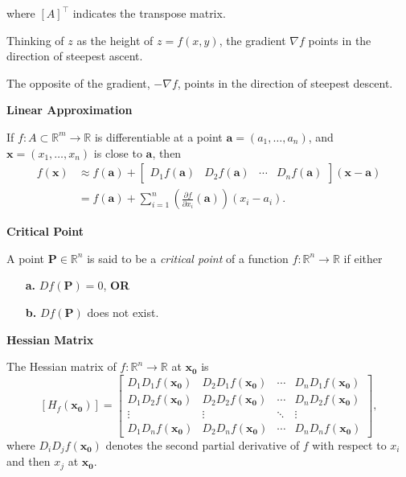 \documentclass{article}
\newcommand{\R}{\mathbb{R}}
\begin{document}
where \( [A]^{\top} \) indicates the transpose matrix.

Thinking of \( z \) as the height of \( z = f(x,y) \), the gradient \( \nabla f \) points in the direction of steepest ascent. 

The opposite of the gradient, \( -\nabla f \), points in the direction of steepest descent.

\vspace{0.5cm}

\noindent \textbf{Linear Approximation}

If \( f : A \subset \mathbb{R}^m \rightarrow \mathbb{R} \) is differentiable at a point \( \bm{a} = (a_1, \ldots, a_n) \), and \( \bm{x} = (x_1, \ldots, x_n) \) is close to \( \bm{a} \), then
\begin{align*}
f(\bm{x}) &\approx f(\bm{a}) + \begin{bmatrix} D_1f(\bm{a}) & D_2f(\bm{a}) & \cdots & D_nf(\bm{a}) \end{bmatrix} (\bm{x} - \bm{a}) \\
         &= f(\bm{a}) + \sum_{i=1}^{n} \left( \frac{\partial f}{\partial x_i}(\bm{a}) \right) (x_i - a_i).
\end{align*}



\vspace{0.5cm}

\noindent \textbf{Critical Point}

A point \( \bm{P} \in \mathbb{R}^n \) is said to be a \textit{critical point} of a function \( f : \mathbb{R}^n \rightarrow \mathbb{R} \) if either
\begin{enumerate}
    \item[\textbf{a.}] \( Df(\bm{P}) = 0 \), \textbf{OR}
    \item[\textbf{b.}] \( Df(\bm{P}) \) does not exist.
\end{enumerate}


\vspace{0.5cm}

\noindent \textbf{Hessian Matrix}

The Hessian matrix of \( f : \R^n \rightarrow \R \) at \( \bm{x_0} \) is
\[
[H_f (\bm{x_0})] =
\begin{bmatrix}
    D_1D_1f(\bm{x_0}) & D_2D_1f(\bm{x_0}) & \cdots & D_nD_1f(\bm{x_0}) \\
    D_1D_2f(\bm{x_0}) & D_2D_2f(\bm{x_0}) & \cdots & D_nD_2f(\bm{x_0}) \\
    \vdots & \vdots & \ddots & \vdots \\
    D_1D_nf(\bm{x_0}) & D_2D_nf(\bm{x_0}) & \cdots & D_nD_nf(\bm{x_0})
\end{bmatrix},
\]
where \( D_iD_jf(\bm{x_0}) \) denotes the second partial derivative of \( f \) with respect to \( x_i \) and then \( x_j \) at \( \bm{x_0} \).
\end{document}
